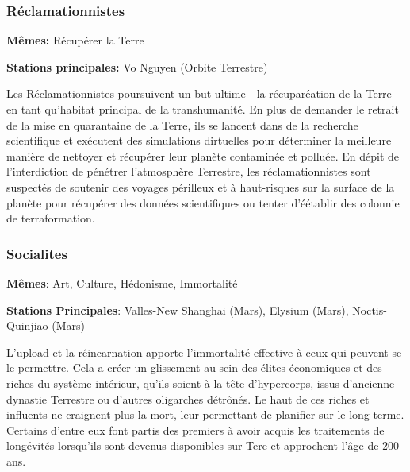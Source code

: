                                              \subsubsection{Réclamationnistes} \label{sec:reclaimers} 

                                             \textbf{Mêmes:} Récupérer la Terre 

                                             \textbf{Stations principales:} Vo Nguyen (Orbite Terrestre) 

                                             Les Réclamationnistes poursuivent un but ultime - la récuparéation de la Terre en tant qu'habitat principal de la transhumanité. En plus de demander le retrait de la mise en quarantaine de la Terre, ils se lancent dans de la recherche scientifique et exécutent des simulations dirtuelles pour déterminer la meilleure manière de nettoyer et récupérer leur planète contaminée et polluée. En dépit de l'interdiction de pénétrer l'atmosphère Terrestre, les réclamationnistes sont suspectés de soutenir des voyages périlleux et à haut-risques sur la surface de la planète pour récupérer des données scientifiques ou tenter d'éétablir des colonnie de terraformation. 

                                             \subsubsection{Socialites} \label{sec:socialites} 

                                             \textbf{Mêmes}: Art, Culture, Hédonisme, Immortalité 

                                             \textbf{Stations Principales}: Valles-New Shanghai (Mars), Elysium (Mars), Noctis-Quinjiao (Mars) 

                                             L'upload et la réincarnation apporte l'immortalité effective à ceux qui peuvent se le permettre. Cela a créer un glissement au sein des élites économiques et des riches du système intérieur, qu'ils soient à la tête d'hypercorps, issus d'ancienne dynastie Terrestre ou d'autres oligarches détrônés. Le haut de ces riches et influents ne craignent plus la mort, leur permettant de planifier sur le long-terme. Certains d'entre eux font partis des premiers à avoir acquis les traitements de longévités lorsqu'ils sont devenus disponibles sur Tere et approchent l'âge de 200 ans. 

